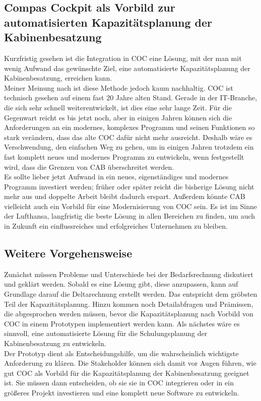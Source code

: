 \documentclass [12pt, a4paper, oneside, titlepage, ngerman]{article}
\begin{document}
\subsection{Compas Cockpit als Vorbild zur automatisierten Kapazitätsplanung der Kabinenbesatzung}
Kurzfristig gesehen ist die Integration in \ac{COC} eine Lösung, mit der man mit wenig Aufwand das gewünschte Ziel, eine automatisierte Kapazitätsplanung der Kabinenbesatzung, erreichen kann.\\
Meiner Meinung nach ist diese Methode jedoch kaum nachhaltig. \ac{COC} ist technisch gesehen auf einem fast 20 Jahre alten Stand. Gerade in der IT-Branche, die sich sehr schnell weiterentwickelt, ist dies eine sehr lange Zeit. Für die Gegenwart reicht es bis jetzt noch, aber in einigen Jahren können sich die Anforderungen an ein modernes, komplexes Programm und seinen Funktionen so stark verändern, dass das alte \ac{COC} dafür nicht mehr ausreicht. Deshalb wäre es Verschwendung, den einfachen Weg zu gehen, um in einigen Jahren trotzdem ein fast komplett neues und modernes Programm zu entwickeln, wenn festgestellt wird, dass die Grenzen von \ac{CAB} überschreitet werden. \\
Es sollte lieber jetzt Aufwand in ein neues, eigenständiges und modernes Programm investiert werden; früher oder später reicht die bisherige Lösung nicht mehr aus und doppelte Arbeit bleibt dadurch erspart. Außerdem könnte \ac{CAB} vielleicht auch ein Vorbild für eine Modernisierung von \ac{COC} sein. Es ist im Sinne der Lufthansa, langfristig die beste Lösung in allen Bereichen zu finden, um auch in Zukunft ein einflussreiches und erfolgreiches Unternehmen zu bleiben.

\subsection{Weitere Vorgehensweise}
Zunächst müssen Probleme und Unterschiede bei der Bedarfsrechnung diskutiert und geklärt werden. Sobald es eine Lösung gibt, diese anzupassen, kann auf Grundlage darauf die Deltarechnung erstellt werden. Das entspricht dem gröbsten Teil der Kapazitätsplanung. Hinzu kommen noch Detailabfragen und Prämissen, die abgesprochen werden müssen, bevor die Kapazitätsplanung nach Vorbild von \ac{COC} in einem Prototypen implementiert werden kann. Als nächstes wäre es sinnvoll, eine automatisierte Lösung für die Schulungsplanung der Kabinenbesatzung zu entwickeln. \\
Der Prototyp dient als Entscheidungshilfe, um die wahrscheinlich wichtigste Anforderung zu klären. Die Stakeholder können sich damit vor Augen führen, wie gut \ac{COC} als Vorbild für die Kapazitätsplanung der Kabinenbesatzung geeignet ist. Sie müssen dann entscheiden, ob sie sie in \ac{COC} integrieren oder in ein größeres Projekt investieren und eine komplett neue Software zu entwickeln.
\end{document}
